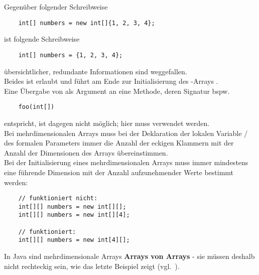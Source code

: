 \noindent
Gegenüber folgender Schreibweise

\begin{verbatim}
    int[] numbers = new int[]{1, 2, 3, 4};
\end{verbatim}

ist folgende Schreibweise

\begin{verbatim}
    int[] numbers = {1, 2, 3, 4};
\end{verbatim}

\noindent
übersichtlicher, redundante Informationen sind weggefallen.\\
Beides ist erlaubt und führt am Ende zur Initialisierung des -Arrays \code{[1, 2, 3, 4]}.\\
Eine Übergabe von  als Argument an eine Methode, deren Signatur bspw.


\begin{verbatim}
    foo(int[])
\end{verbatim}

\noindent
entspricht, ist dagegen nicht möglich; hier muss  verwendet werden.\\

\noindent
Bei mehrdimensionalen Arrays muss bei der Deklaration der lokalen Variable / des formalen Parameters immer die Anzahl der eckigen Klammern \code{[]} mit der Anzahl der Dimensionen des Arrays übereinstimmen.\\
Bei der Initialisierung eines mehrdimensionalen Arrays muss immer mindestens eine führende Dimension mit der Anzahl aufzunehmender Werte bestimmt werden:

\begin{verbatim}
    // funktioniert nicht:
    int[][] numbers = new int[][];
    int[][] numbers = new int[][4];

    // funktioniert:
    int[][] numbers = new int[4][];
\end{verbatim}

In Java sind mehrdimensionale Arrays \textbf{Arrays von Arrays} - sie müssen deshalb nicht rechteckig sein, wie das letzte Beispiel zeigt (vgl.~\cite[273 ff.]{Ull23}).